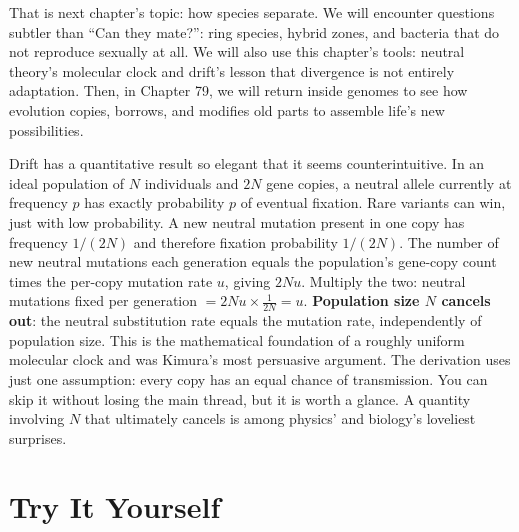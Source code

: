 That is next chapter's topic: how species separate. We will encounter questions subtler than ``Can they mate?'': ring species, hybrid zones, and bacteria that do not reproduce sexually at all. We will also use this chapter's tools: neutral theory's molecular clock and drift's lesson that divergence is not entirely adaptation. Then, in Chapter 79, we will return inside genomes to see how evolution copies, borrows, and modifies old parts to assemble life's new possibilities.

\begin{tiaozhan}
Drift has a quantitative result so elegant that it seems counterintuitive. In an ideal population of $N$ individuals and $2N$ gene copies, a neutral allele currently at frequency $p$ has exactly probability $p$ of eventual fixation. Rare variants can win, just with low probability. A new neutral mutation present in one copy has frequency $1/(2N)$ and therefore fixation probability $1/(2N)$. The number of new neutral mutations each generation equals the population's gene-copy count times the per-copy mutation rate $u$, giving $2Nu$. Multiply the two: neutral mutations fixed per generation $= 2Nu \times \frac{1}{2N} = u$. \textbf{Population size $N$ cancels out}: the neutral substitution rate equals the mutation rate, independently of population size. This is the mathematical foundation of a roughly uniform molecular clock and was Kimura's most persuasive argument. The derivation uses just one assumption: every copy has an equal chance of transmission. You can skip it without losing the main thread, but it is worth a glance. A quantity involving $N$ that ultimately cancels is among physics' and biology's loveliest surprises.
\end{tiaozhan}

\section*{Try It Yourself}


